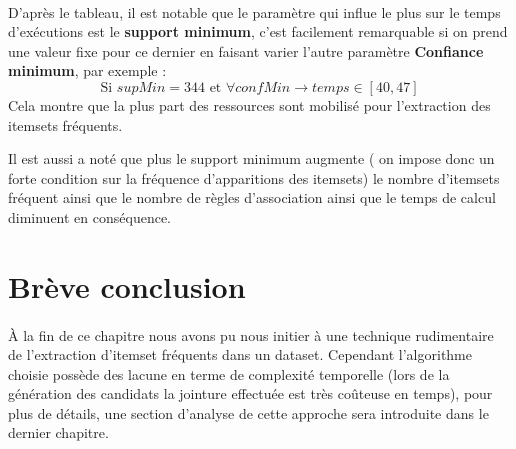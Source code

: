 			\paragraph{}
			D'après le tableau, il est notable que le paramètre qui influe le plus sur le temps d'exécutions est le \textbf{support minimum}, c'est facilement remarquable si on prend une valeur fixe pour ce dernier en faisant varier l'autre paramètre \textbf{Confiance minimum}, par exemple : \\
			\[
				\text{Si } supMin = 344 \text{ et } \forall confMin \rightarrow temps \in \left[ 40,47\right]
			\]
			Cela montre que la plus part des ressources sont mobilisé pour l'extraction des itemsets fréquents.
			\par Il est aussi a noté que plus le support minimum augmente ( on impose donc un forte condition sur la fréquence d'apparitions des itemsets) le nombre d'itemsets fréquent ainsi que le nombre de règles d'association ainsi que le temps de calcul diminuent en conséquence.
	\section{Brève conclusion}
		\paragraph{}
		À la fin de ce chapitre nous avons pu nous initier à une technique rudimentaire de l'extraction d'itemset fréquents dans un dataset. Cependant l'algorithme choisie possède des lacune en terme de complexité temporelle (lors de la génération des candidats la jointure effectuée est très coûteuse en temps), pour plus de détails, une section d'analyse de cette approche sera introduite dans le dernier chapitre.
	
